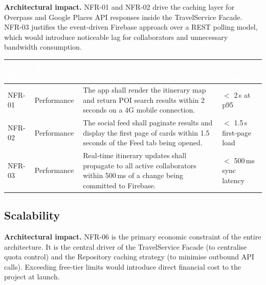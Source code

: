 \documentclass[12pt, a4paper]{article}
\newcommand{\reqid}[1]{\textsc{\small #1}}
\newcommand{\thcell}[1]{\textcolor{white}{\textbf{\small #1}}}
\begin{document}
\begin{tcolorbox}[notebox]
  \textbf{Architectural impact.} NFR-01 and NFR-02 drive the caching layer for Overpass and Google Places API responses inside the TravelService Facade. NFR-03 justifies the event-driven Firebase approach over a REST polling model, which would introduce noticeable lag for collaborators and unnecessary bandwidth consumption.
\end{tcolorbox}

\vspace{0.4em}
\begin{longtable}{C{1.5cm} C{2.4cm} L{7.0cm} C{2.7cm}}
\toprule
{}
\thcell{Req ID} & \thcell{Quality Attr.} & \thcell{Requirement} & \thcell{Metric / Target} \\
\midrule
\endhead
\bottomrule
\endfoot

\reqid{NFR-01} & Performance &
The app shall render the itinerary map and return POI search results within 2 seconds on a 4G mobile connection. &
$<$ 2\,s at p95 \\

\reqid{NFR-02} & Performance &
The social feed shall paginate results and display the first page of cards within 1.5 seconds of the Feed tab being opened. &
$<$ 1.5\,s first-page load \\

\reqid{NFR-03} & Performance &
Real-time itinerary updates shall propagate to all active collaborators within 500\,ms of a change being committed to Firebase. &
$<$ 500\,ms sync latency \\

\end{longtable}

\subsection{Scalability}

\begin{tcolorbox}[notebox]
  \textbf{Architectural impact.} NFR-06 is the primary economic constraint of the entire architecture. It is the central driver of the TravelService Facade (to centralise quota control) and the Repository caching strategy (to minimise outbound API calls). Exceeding free-tier limits would introduce direct financial cost to the project at launch.
\end{tcolorbox}
\end{document}
